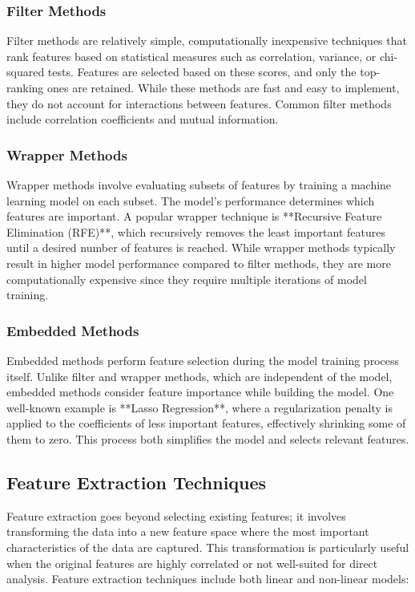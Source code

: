 \documentclass{article}
\begin{document}
\subsubsection{Filter Methods}
Filter methods are relatively simple, computationally inexpensive techniques that rank features based on statistical measures such as correlation, variance, or chi-squared tests. Features are selected based on these scores, and only the top-ranking ones are retained. While these methods are fast and easy to implement, they do not account for interactions between features. Common filter methods include correlation coefficients and mutual information.

\subsubsection{Wrapper Methods}
Wrapper methods involve evaluating subsets of features by training a machine learning model on each subset. The model’s performance determines which features are important. A popular wrapper technique is **Recursive Feature Elimination (RFE)**, which recursively removes the least important features until a desired number of features is reached. While wrapper methods typically result in higher model performance compared to filter methods, they are more computationally expensive since they require multiple iterations of model training.

\subsubsection{Embedded Methods}
Embedded methods perform feature selection during the model training process itself. Unlike filter and wrapper methods, which are independent of the model, embedded methods consider feature importance while building the model. One well-known example is **Lasso Regression**, where a regularization penalty is applied to the coefficients of less important features, effectively shrinking some of them to zero. This process both simplifies the model and selects relevant features.

\subsection{Feature Extraction Techniques}
Feature extraction goes beyond selecting existing features; it involves transforming the data into a new feature space where the most important characteristics of the data are captured. This transformation is particularly useful when the original features are highly correlated or not well-suited for direct analysis. Feature extraction techniques include both linear and non-linear models:
\end{document}
